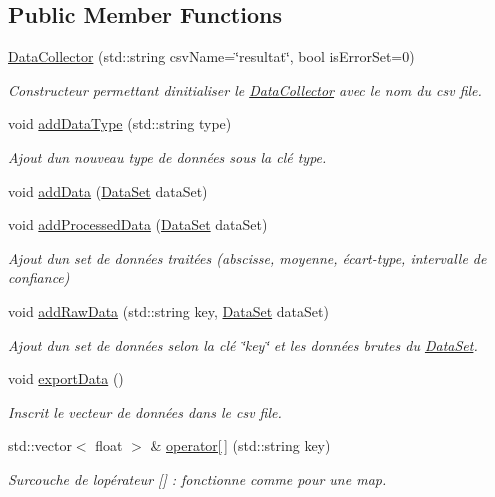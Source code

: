 \subsection*{Public Member Functions}
\begin{DoxyCompactItemize}
\item 
\hyperlink{classDataCollector_a75668f55c1c689c231d00efd1613f3fd}{Data\+Collector} (std\+::string csv\+Name=\char`\"{}resultat\char`\"{}, bool is\+Error\+Set=0)
\begin{DoxyCompactList}\small\item\em Constructeur permettant d\textquotesingle{}initialiser le \hyperlink{classDataCollector}{Data\+Collector} avec le nom du csv file. \end{DoxyCompactList}\item 
void \hyperlink{classDataCollector_a04219510b176548e0fd8eb084bcc1848}{add\+Data\+Type} (std\+::string type)
\begin{DoxyCompactList}\small\item\em Ajout d\textquotesingle{}un nouveau type de données sous la clé type. \end{DoxyCompactList}\item 
void \hyperlink{classDataCollector_ac0d50d38e3a5107541f929d4ea3a8cb5}{add\+Data} (\hyperlink{classDataSet}{Data\+Set} data\+Set)
\item 
void \hyperlink{classDataCollector_afd44db46dab8f105d4b36ef91a169090}{add\+Processed\+Data} (\hyperlink{classDataSet}{Data\+Set} data\+Set)
\begin{DoxyCompactList}\small\item\em Ajout d\textquotesingle{}un set de données traitées (abscisse, moyenne, écart-\/type, intervalle de confiance) \end{DoxyCompactList}\item 
void \hyperlink{classDataCollector_a3a7379e572a3123d83772ca0dd79f3b6}{add\+Raw\+Data} (std\+::string key, \hyperlink{classDataSet}{Data\+Set} data\+Set)
\begin{DoxyCompactList}\small\item\em Ajout d\textquotesingle{}un set de données selon la clé \char`\"{}key\char`\"{} et les données brutes du \hyperlink{classDataSet}{Data\+Set}. \end{DoxyCompactList}\item 
void \hyperlink{classDataCollector_a6af99e22f24d045d607cb708866b9ce2}{export\+Data} ()
\begin{DoxyCompactList}\small\item\em Inscrit le vecteur de données dans le csv file. \end{DoxyCompactList}\item 
std\+::vector$<$ float $>$ \& \hyperlink{classDataCollector_aa7cc44e889e13c2b03d0128917c57454}{operator\mbox{[}$\,$\mbox{]}} (std\+::string key)
\begin{DoxyCompactList}\small\item\em Surcouche de l\textquotesingle{}opérateur \mbox{[}\mbox{]} \+: fonctionne comme pour une map. \end{DoxyCompactList}\end{DoxyCompactItemize}
